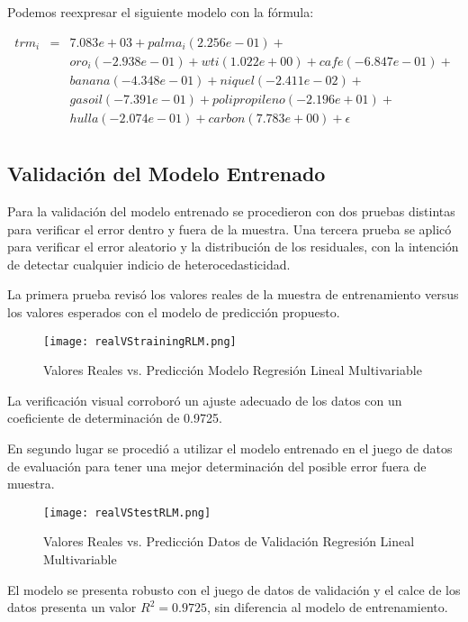 Podemos reexpresar el siguiente modelo con la fórmula:

\begin{eqnarray*}
    trm_i & = & 7.083e+03 + palma_i(2.256e-01) + \\
& & oro_i(-2.938e-01) + wti(1.022e+00) + cafe(-6.847e-01) +  \\
& & banana(-4.348e-01) + niquel(-2.411e-02) + \\ 
& & gasoil(-7.391e-01) + polipropileno(-2.196e+01) + \\
& & hulla(-2.074e-01) + carbon(7.783e+00) + \epsilon \\
\end{eqnarray*}

\subsection{Validación del Modelo Entrenado}
Para la validación del modelo entrenado se procedieron con dos pruebas distintas para verificar el error dentro y fuera de la muestra. Una tercera prueba se aplicó para verificar el error aleatorio y la distribución de los residuales, con la intención de detectar cualquier indicio de heterocedasticidad. 

La primera prueba revisó los valores reales de la muestra de entrenamiento versus los valores esperados con el modelo de predicción propuesto. 

\begin{figure}[H]
    \centering
    \texttt{[image: realVStrainingRLM.png]}
    \caption{Valores Reales vs. Predicción Modelo Regresión Lineal Multivariable}
\end{figure}   

La verificación visual corroboró un ajuste adecuado de los datos con un coeficiente de determinación de 0.9725.

En segundo lugar se procedió a utilizar el modelo entrenado en el juego de datos de evaluación para tener una mejor determinación del posible error fuera de muestra. 

\begin{figure}[H]
    \centering
    \texttt{[image: realVStestRLM.png]}
    \caption{Valores Reales vs. Predicción Datos de Validación Regresión Lineal Multivariable}
\end{figure}   

El modelo se presenta robusto con el juego de datos de validación y el calce de los datos presenta un valor $R^2 = 0.9725$, sin diferencia al modelo de entrenamiento. 

